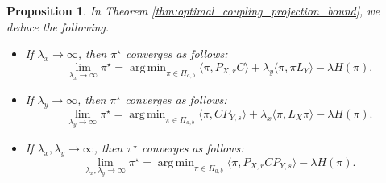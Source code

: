 \documentclass{article}
\newtheorem{proposition}{Proposition}
\theoremstyle{definition}
\DeclareMathOperator*{\argmin}{arg\,min}
\begin{document}
\begin{proposition}
    In Theorem \ref{thm:optimal_coupling_projection_bound}, we deduce the following.
    \begin{itemize}
        \item[(i)] If $\lambda_x \to \infty$, then $\pi^\star$ converges as follows:
        \begin{equation*}
            \lim_{\lambda_x \to \infty} \pi^\star = \argmin_{\pi \in \Pi_{a, b}} \langle \pi, P_{X, r} C \rangle + \lambda_y \langle \pi, \pi L_Y \rangle - \lambda H(\pi).
        \end{equation*}
        \item[(ii)] If $\lambda_y \to \infty$, then $\pi^\star$ converges as follows:
        \begin{equation*}
            \lim_{\lambda_y \to \infty} \pi^\star = \argmin_{\pi \in \Pi_{a, b}} \langle \pi, C P_{Y, s} \rangle + \lambda_x \langle \pi, L_X \pi \rangle - \lambda H(\pi).
        \end{equation*}
        \item[(iii)] If $\lambda_x, \lambda_y \to \infty$, then $\pi^\star$ converges as follows:
        \begin{equation*}
            \lim_{\lambda_x, \lambda_y \to \infty} \pi^\star = \argmin_{\pi \in \Pi_{a, b}} \langle \pi, P_{X, r} C P_{Y, s} \rangle - \lambda H(\pi).
        \end{equation*}
    \end{itemize}
\end{proposition}
\end{document}
